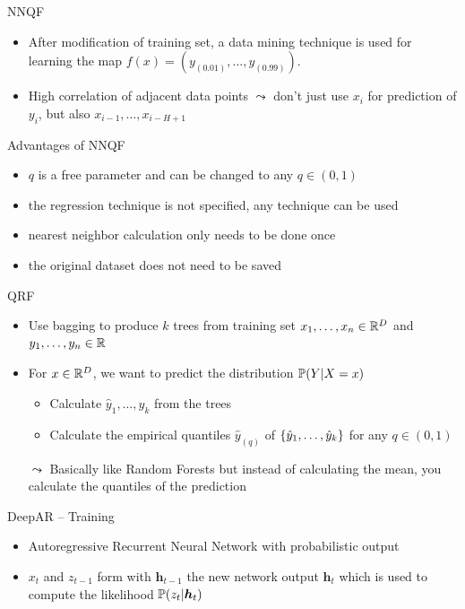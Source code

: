 \documentclass[10pt,aspectratio=169]{beamer}
\begin{document}
\begin{frame}{NNQF}
    \begin{itemize}
        \item After modification of training set, a data mining technique is used for learning the map \(f(x) = (y_{(0.01)}, \ldots, y_{(0.99)})\).
        \item High correlation of adjacent data points \(\leadsto\) don't just use \(x_i\) for prediction of \(y_i\), but also 
        \(x_{i-1}, \ldots, x_{i-H+1}\)
    \end{itemize}
\end{frame}

\begin{frame}{Advantages of NNQF}
    \begin{itemize}
        \item \(q\) is a free parameter and can be changed to any \(q\in (0,1)\)
        \item the regression technique is not specified, any technique can be used
        \item nearest neighbor calculation only needs to be done once
        \item the original dataset does not need to be saved
    \end{itemize}
\end{frame}

\begin{frame}{QRF}
    \begin{itemize}
        \item Use bagging to produce \(k\) trees from training set \(x_1, \ldots, x_n \in \R^D\) and \(y_1, \ldots, y_n \in \R\)
        \item For \(x\in \R^D\), we want to predict the distribution \(\P(Y | X=x)\)
        \begin{itemize}
            \item Calculate \(\hat{y}_1, \ldots, \hat{y}_k\) from the trees 
            \item Calculate the empirical quantiles \(\hat{y}_{(q)}\) of \(\set{\hat{y}_1, \ldots, \hat{y}_k}\) for any \(q \in (0,1)\)
        \end{itemize}
        \item[\(\leadsto\)] Basically like Random Forests but instead of calculating the mean, you calculate the quantiles of the prediction
    \end{itemize}
\end{frame}

\begin{frame}[fragile]{DeepAR -- Training}
    \begin{center}
        
    \end{center}
    \begin{itemize}
        \item Autoregressive Recurrent Neural Network with probabilistic output
        \item \(x_t\) and \(z_{t-1}\) form with \(\boldsymbol{h}_{t-1}\) the new network output \(\boldsymbol{h}_t\)
        which is used to compute the likelihood \(\P(z_t | \boldsymbol{h}_t)\)
    \end{itemize}
\end{frame}
\end{document}

